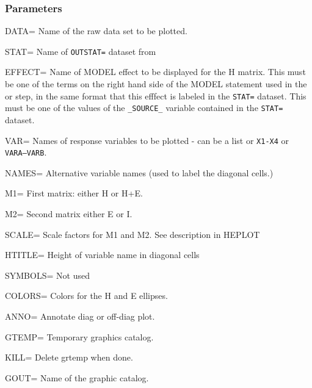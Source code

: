 \subsubsection*{Parameters}
\begin{proglist}

\item[DATA=] Name of the raw data set to be plotted. 

\item[STAT=] Name of \texttt{OUTSTAT=} dataset from 

\item[EFFECT=] Name of MODEL effect to be displayed for the H matrix.
This must be one of
the terms on the right hand side of the MODEL statement used
in the  or  step, in the same format that this
efffect is labeled in the \texttt{STAT=} dataset. This must be one of
the values of the \verb|_SOURCE_| variable contained in the \texttt{STAT=} 
dataset.

\item[VAR=] Names of response variables to be plotted - can be
a list or \texttt{X1-X4} or \texttt{VARA--VARB}. 

\item[NAMES=] Alternative variable names (used to label the diagonal
cells.)

\item[M1=] First matrix: either H or H+E. 

\item[M2=] Second matrix either E or I. 

\item[SCALE=] Scale factors for M1 and M2.  See description in HEPLOT

\item[HTITLE=] Height of variable name in diagonal cells

\item[SYMBOLS=] Not used

\item[COLORS=] Colors for the H and E ellipses. 

\item[ANNO=] Annotate diag or off-diag plot. 

\item[GTEMP=] Temporary graphics catalog. 

\item[KILL=] Delete grtemp when done. 

\item[GOUT=] Name of the graphic catalog. 

\end{proglist}
